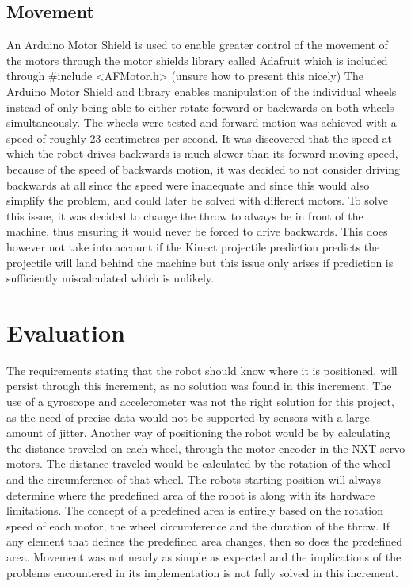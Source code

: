 \subsection{Movement}
\label{sec:i1MovementImplementation}
An Arduino Motor Shield is used to enable greater control of the movement of the motors through the motor shields library called Adafruit which is included through \#include <AFMotor.h> (unsure how to present this nicely)
The Arduino Motor Shield and library enables manipulation of the individual wheels instead of only being able to either rotate forward or backwards on both wheels simultaneously. 
The wheels were tested and forward motion was achieved with a speed of roughly 23 centimetres per second. It was discovered that the speed at which the robot drives backwards is much slower than its forward moving speed, because of the speed of backwards motion, it was decided to not consider driving backwards at all since the speed were inadequate and since this would also simplify the problem, and could later be solved with different motors. To solve this issue, it was decided to change the throw to always be in front of the machine, thus ensuring it would never be forced to drive backwards. This does however not take into account if the Kinect projectile prediction predicts the projectile will land behind the machine but this issue only arises if prediction is sufficiently miscalculated which is unlikely.

\section{Evaluation}
\label{sec:i1Evaluation}
The requirements stating that the robot should know where it is positioned, will persist through this increment, as no solution was found in this increment. The use of a gyroscope and accelerometer was not the right solution for this project, as the need of precise data would not be supported by sensors with a large amount of jitter. Another way of positioning the robot would be by calculating the distance traveled on each wheel, through the motor encoder in the NXT servo motors. The distance traveled would be calculated by the rotation of the wheel and the circumference of that wheel.
The robots starting position will always determine where the predefined area of the robot is along with its hardware limitations. The concept of a predefined area is entirely based on the rotation speed of each motor, the wheel circumference and the duration of the throw. If any element that defines the predefined area changes, then so does the predefined area. Movement was not nearly as simple as expected and the implications of the problems encountered in its implementation is not fully solved in this increment.

